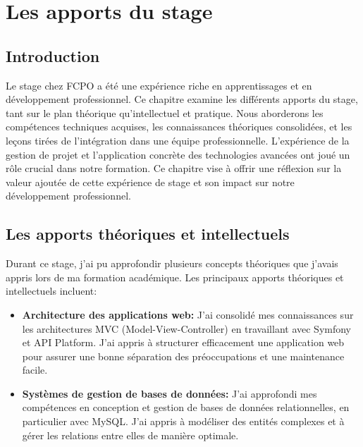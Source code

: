 \chapter{Les apports du stage}
\label{chap:Chapter 5 title} 
\section*{Introduction}

\hspace{16pt}Le stage chez FCPO a été une expérience riche en apprentissages et en développement professionnel. Ce chapitre examine les différents apports du stage, tant sur le plan théorique qu'intellectuel et pratique. Nous aborderons les compétences techniques acquises, les connaissances théoriques consolidées, et les leçons tirées de l'intégration dans une équipe professionnelle. L'expérience de la gestion de projet et l'application concrète des technologies avancées ont joué un rôle crucial dans notre formation. Ce chapitre vise à offrir une réflexion sur la valeur ajoutée de cette expérience de stage et son impact sur notre développement professionnel.

\pagebreak

\section{Les apports théoriques et intellectuels}

\hspace{16pt} Durant ce stage, j’ai pu approfondir plusieurs concepts théoriques que j'avais appris lors de ma formation académique. Les principaux apports théoriques et intellectuels incluent:

\begin{itemize}
  \item \textbf{Architecture des applications web: }J’ai consolidé mes connaissances sur les architectures MVC (Model-View-Controller) en travaillant avec Symfony et API Platform. J’ai appris à structurer efficacement une application web pour assurer une bonne séparation des préoccupations et une maintenance facile.
  \item \textbf{Systèmes de gestion de bases de données: }J’ai approfondi mes compétences en conception et gestion de bases de données relationnelles, en particulier avec MySQL. J’ai appris à modéliser des entités complexes et à gérer les relations entre elles de manière optimale.
\end{itemize}

